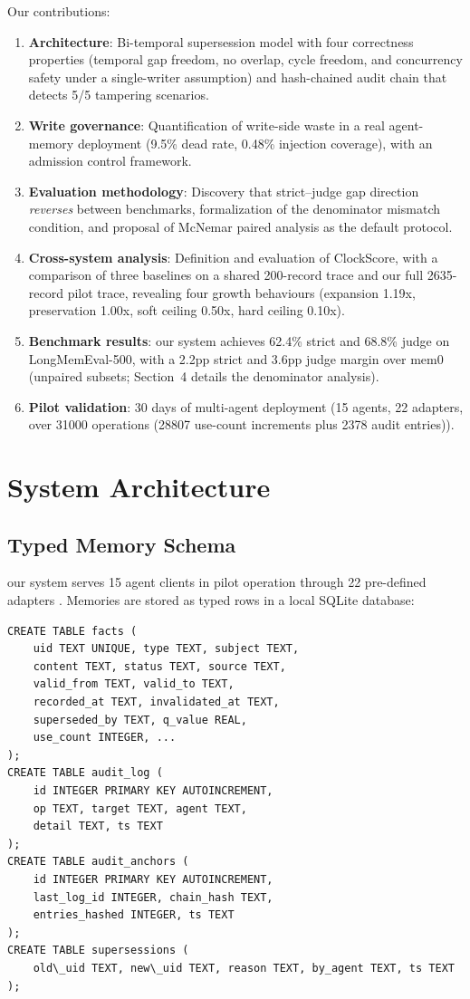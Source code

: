 \documentclass{llncs}
\begin{document}
Our contributions:
\begin{enumerate}
\item \textbf{Architecture}: Bi-temporal supersession model with four correctness properties (temporal gap freedom, no overlap, cycle freedom, and concurrency safety under a single-writer assumption) and hash-chained audit chain that detects 5/5 tampering scenarios.
\item \textbf{Write governance}: Quantification of write-side waste in a real agent-memory deployment (9.5\% dead rate, 0.48\% injection coverage), with an admission control framework.
\item \textbf{Evaluation methodology}: Discovery that strict--judge gap direction \emph{reverses} between benchmarks, formalization of the denominator mismatch condition, and proposal of McNemar paired analysis as the default protocol.
\item \textbf{Cross-system analysis}: Definition and evaluation of ClockScore, with a comparison of three baselines on a shared 200-record trace and our full 2{}635-record pilot trace, revealing four growth behaviours (expansion 1.19x, preservation 1.00x, soft ceiling 0.50x, hard ceiling 0.10x).
\item \textbf{Benchmark results}: our system achieves 62.4\% strict and 68.8\% judge on LongMemEval-500, with a 2.2pp strict and 3.6pp judge margin over mem0 (unpaired subsets; Section~4 details the denominator analysis).
\item \textbf{Pilot validation}: 30 days of multi-agent deployment (15 agents, 22 adapters, over 31{}000 operations (28{}807 use-count increments plus 2{}378 audit entries)).
\end{enumerate}

\section{System Architecture}


\subsection{Typed Memory Schema}
our system serves 15 agent clients in pilot operation through 22 pre-defined adapters . Memories are stored as typed rows in a local SQLite database:

\begin{verbatim}
CREATE TABLE facts (
    uid TEXT UNIQUE, type TEXT, subject TEXT,
    content TEXT, status TEXT, source TEXT,
    valid_from TEXT, valid_to TEXT,
    recorded_at TEXT, invalidated_at TEXT,
    superseded_by TEXT, q_value REAL,
    use_count INTEGER, ...
);
CREATE TABLE audit_log (
    id INTEGER PRIMARY KEY AUTOINCREMENT,
    op TEXT, target TEXT, agent TEXT,
    detail TEXT, ts TEXT
);
CREATE TABLE audit_anchors (
    id INTEGER PRIMARY KEY AUTOINCREMENT,
    last_log_id INTEGER, chain_hash TEXT,
    entries_hashed INTEGER, ts TEXT
);
CREATE TABLE supersessions (
    old\_uid TEXT, new\_uid TEXT, reason TEXT, by_agent TEXT, ts TEXT
);
\end{verbatim}
\end{document}
